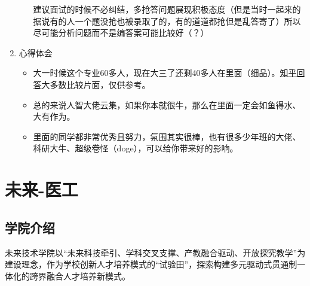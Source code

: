 \documentclass[zihao=-4,fontset=none]{Beautybook-CN}
\begin{document}
\begin{enumerate}
\begin{enumerate}
	      	      \begin{example}
	      	      	建议面试的时候不必纠结，多抢答问题展现积极态度（但是当时一起来的据说有的人一个题没抢也被录取了的，有的道道都抢但是乱答寄了）所以尽可能分析问题而不是编答案可能比较好（？）
	      	      \end{example}
	      	      
	      \end{enumerate}    
	      	      	      
	\item 心得体会 
	      \begin{itemize}
	      	\item 大一时候这个专业60多人，现在大三了还剩40多人在里面（细品）。\href{https://www.zhihu.com/question/368080680/answer/2993647435}{知乎回答}大多数比较片面，仅供参考。
	      	\item 总的来说人智大佬云集，如果你本就很牛，那么在里面一定会如鱼得水、大有作为。
	      	\item 里面的同学都非常优秀且努力，氛围其实很棒，也有很多少年班的大佬、科研大牛、超级卷怪（doge），可以给你带来好的影响。
	      \end{itemize}
\end{enumerate}
\section{未来-医工}

\subsection{学院介绍}
未来技术学院以“未来科技牵引、学科交叉支撑、产教融合驱动、开放探究教学”为建设理念，作为学校创新人才培养模式的“试验田”，探索构建多元驱动式贯通制一体化的跨界融合人才培养新模式。
\end{document}
